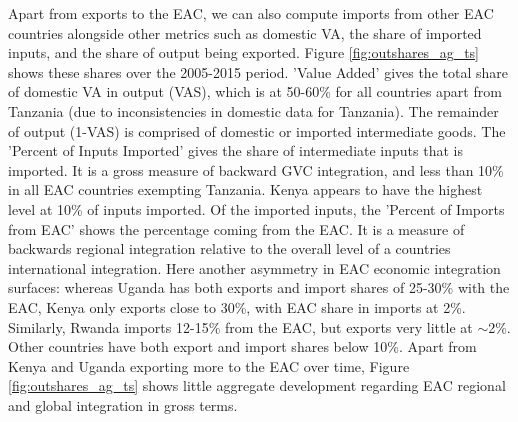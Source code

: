 \documentclass[a4paper]{article}
\begin{document}


Apart from exports to the EAC, we can also compute imports from other EAC countries alongside other metrics such as domestic VA, the share of imported inputs, and the share of output being exported. Figure \ref{fig:outshares_ag_ts} shows these shares over the 2005-2015 period. 'Value Added' gives the total share of domestic VA in output (VAS), which is at 50-60\% for all countries apart from Tanzania (due to inconsistencies in domestic data for Tanzania). The remainder of output (1-VAS) is comprised of domestic or imported intermediate goods. The 'Percent of Inputs Imported' gives the share of intermediate inputs that is imported. It is a gross measure of backward GVC integration, and less than 10\% in all EAC countries exempting Tanzania. Kenya appears to have the highest level at 10\% of inputs imported. Of the imported inputs, the 'Percent of Imports from EAC' shows the percentage coming from the EAC. It is a measure of backwards regional integration relative to the overall level of a countries international integration. %
Here another asymmetry in EAC economic integration surfaces: whereas Uganda has both exports and import shares of 25-30\% with the EAC, Kenya only exports close to 30\%, with EAC share in imports at 2\%. Similarly, Rwanda imports 12-15\% from the EAC, but exports very little at $\sim$2\%. Other countries have both export and import shares below 10\%. Apart from Kenya and Uganda exporting more to the EAC over time, Figure \ref{fig:outshares_ag_ts} shows little aggregate development regarding EAC regional and global integration in gross terms. 
\end{document}

